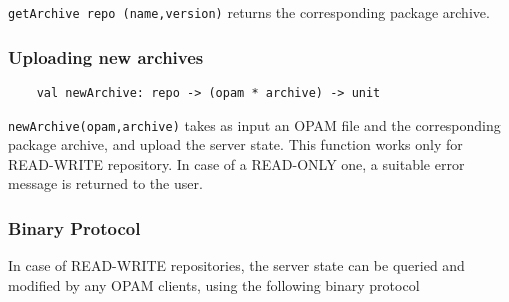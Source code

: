 \documentclass[a4paper,11pt]{article}
\begin{document}
{\tt getArchive repo (name,version)} returns the corresponding package
archive.

\subsubsection{Uploading new archives}
\label{newArchive}

\begin{verbatim}
    val newArchive: repo -> (opam * archive) -> unit
\end{verbatim}

{\tt newArchive(opam,archive)} takes as input an OPAM file and the
corresponding package archive, and upload the server state. This
function works only for READ-WRITE repository. In case of a READ-ONLY
one, a suitable error message is returned to the user.

\subsubsection{Binary Protocol}

In case of READ-WRITE repositories, the server state can be queried
and modified by any OPAM clients, using the following binary protocol
\end{document}
